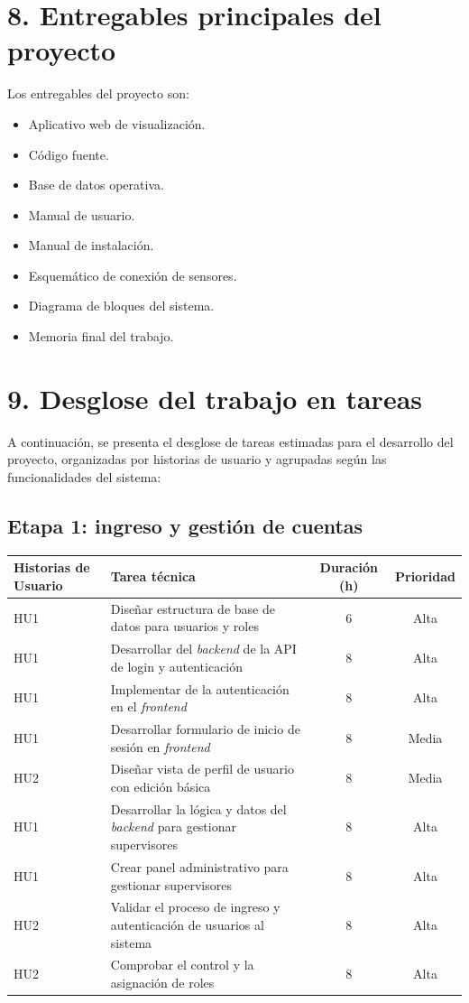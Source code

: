 \documentclass[
11pt, %
]{charter}
\begin{document}
\section{8. Entregables principales del proyecto}
\label{sec:entregables}

Los entregables del proyecto son:

\begin{itemize}
\item Aplicativo web de visualización.
\item Código fuente.
\item Base de datos operativa.
\item Manual de usuario.
\item Manual de instalación.
\item Esquemático de conexión de sensores.
\item Diagrama de bloques del sistema.
\item Memoria final del trabajo.

\end{itemize}

\section{9. Desglose del trabajo en tareas}
\label{sec:wbs}

A continuación, se presenta el desglose de tareas estimadas para el desarrollo del proyecto, organizadas por historias de usuario y agrupadas según las funcionalidades del sistema:

\subsection*{Etapa 1: ingreso y gestión de cuentas}
\begin{tabular}{|p{2.5cm}|p{7.5cm}|c|c|}
\hline
\textbf{Historias de Usuario} & \textbf{Tarea técnica} & \textbf{Duración (h)} & \textbf{Prioridad} \\
\hline
HU1 & Diseñar estructura de base de datos para usuarios y roles & 6 & Alta \\
\hline
HU1 & Desarrollar del \textit{backend} de la API de login y autenticación & 8 & Alta \\
\hline
HU1 & Implementar de la autenticación en el \textit{frontend} & 8 & Alta \\
\hline
HU1 & Desarrollar formulario de inicio de sesión en \textit{frontend} & 8 & Media \\
\hline
HU2 & Diseñar vista de perfil de usuario con edición básica & 8 & Media \\
\hline
HU1 & Desarrollar la lógica y datos del \textit{backend} para gestionar supervisores & 8 & Alta \\
\hline
HU1 & Crear panel administrativo para gestionar supervisores & 8 & Alta \\
\hline
HU2 & Validar el proceso de ingreso y autenticación de usuarios al sistema & 8 & Alta \\
\hline
HU2 & Comprobar el control y la asignación de roles & 8 & Alta \\
\hline
\end{tabular}
\end{document}
